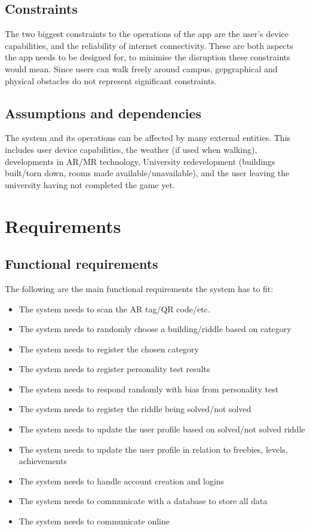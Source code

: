 \documentclass[10pt,twocolumn]{article} %
\begin{document}
\subsection*{Constraints}
The two biggest constraints to the operations of the app are the user's device capabilities, and the reliability of internet connectivity. These are both aspects the app needs to be designed for, to minimise the disruption these constraints would mean. Since users can walk freely around campus, gepgraphical and physical obstacles do not represent significant constraints.

\subsection*{Assumptions and dependencies}
The system and its operations can be affected by many external entities. This includes user device capabilities, the weather (if used when walking), developments in AR/MR technology, University redevelopment (buildings built/torn down, rooms made available/unavailable), and the user leaving the university having not completed the game yet.

\section*{Requirements}

\subsection*{Functional requirements}
The following are the main functional requirements the system has to fit:
\begin{itemize}[noitemsep]
  \item The system needs to scan the AR tag/QR code/etc.
  \item The system needs to randomly choose a building/riddle based on category
  \item The system needs to register the chosen category 
  \item The system needs to register personality test results
  \item The system needs to respond randomly with bias from personality test
  \item The system needs to register the riddle being solved/not solved
  \item The system needs to update the user profile based on solved/not solved riddle
  \item The system needs to update the user profile in relation to freebies, levels, achievements
  \item The system needs to handle account creation and logins
  \item The system needs to communicate with a database to store all data
  \item The system needs to communicate online
\end{itemize}
\end{document}
